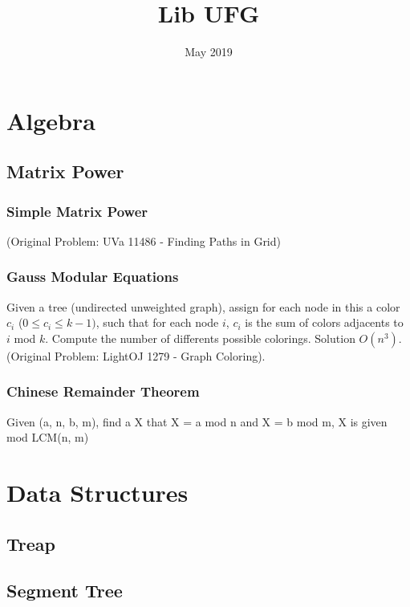 \documentclass{report}
\title{Lib UFG}
\date{May 2019}
\newcommand{\RomanNumeralCaps}[1]
    {\MakeUppercase{\romannumeral #1}}
\begin{document}
\maketitle
 
 
\tableofcontents{}
    \chapter{Algebra \RomanNumeralCaps{1}}
    \section{Matrix Power}
    \subsection{Simple Matrix Power}
    (Original Problem: UVa 11486 - Finding Paths in Grid)
    
    \subsection{Gauss Modular Equations}
    Given a tree (undirected unweighted graph), assign for each node in this a color $c_i$ ($0 \leq c_i \leq k - 1)$, such that for each node $i$, $c_i$ is the sum of colors adjacents to $i$ mod $k$.
    \bigskip
    Compute the number of differents possible colorings.
    \bigskip
    Solution $O(n^3)$.
    \bigskip
    (Original Problem: LightOJ 1279 - Graph Coloring).
    
    \subsection{Chinese Remainder Theorem}
    Given (a, n, b, m), find a X that X = a mod n and X = b mod m, X is given mod LCM(n, m)
    
    
    \chapter{Data Structures \RomanNumeralCaps{2}}
    \section{Treap}
    
    \newpage
    \section{Segment Tree}
\end{document}
